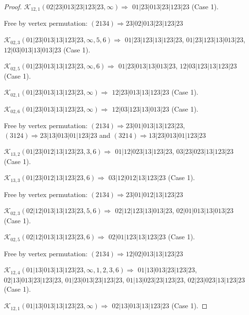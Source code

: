 \documentclass[12pt]{article}
\theoremstyle{plain}
\theoremstyle{definition}
\theoremstyle{remark}
\newcommand{\fancy}[1]{\mathcal{#1}}
\def\K{\fancy{K}}
\begin{document}
\begin{proof}
	$\K_{12,1}(02|23|013|23|123|23,\infty)\Rightarrow $ $01|23|013|23|123|23$ (Case 1).
	
	
	
	Free by vertex permutation: $(2 1 3 4)\Rightarrow 23|02|013|23|123|23$
	
	
	
	\bigskip
	
	$\K_{02,3}(01|23|013|13|123|23,\infty,5, 6)\Rightarrow $ $01|23|123|13|123|23$, $01|23|123|13|013|23$, $12|03|013|13|013|23$ (Case 1).
	
	$\K_{02,5}(01|23|013|13|123|23,\infty,6)\Rightarrow $ $01|23|013|13|013|23$, $12|03|123|13|123|23$ (Case 1).
	
	$\K_{02,1}(01|23|013|13|123|23,\infty)\Rightarrow $ $12|23|013|13|123|23$ (Case 1).
	
	$\K_{02,6}(01|23|013|13|123|23,\infty)\Rightarrow $ $12|03|123|13|013|23$ (Case 1).
	
	
	
	Free by vertex permutation: $(2 1 3 4)\Rightarrow 23|01|013|13|123|23$, $(3 1 2 4)\Rightarrow 23|13|013|01|123|23$ and $(3 2 1 4)\Rightarrow 13|23|013|01|123|23$
	
	
	
	\bigskip
	
	$\K_{13,2}(01|23|012|13|123|23,3, 6)\Rightarrow $ $01|12|023|13|123|23$, $03|23|023|13|123|23$ (Case 1).
	
	$\K_{13,3}(01|23|012|13|123|23,6)\Rightarrow $ $03|12|012|13|123|23$ (Case 1).
	
	
	
	Free by vertex permutation: $(2 1 3 4)\Rightarrow 23|01|012|13|123|23$
	
	
	
	\bigskip
	
	$\K_{02,3}(02|12|013|13|123|23,5, 6)\Rightarrow $ $02|12|123|13|013|23$, $02|01|013|13|013|23$ (Case 1).
	
	$\K_{02,5}(02|12|013|13|123|23,6)\Rightarrow $ $02|01|123|13|123|23$ (Case 1).
	
	
	
	Free by vertex permutation: $(2 1 3 4)\Rightarrow 12|02|013|13|123|23$
	
	
	
	\bigskip
	
	$\K_{12,4}(01|13|013|13|123|23,\infty,1, 2, 3, 6)\Rightarrow $ $01|13|013|23|123|23$, $02|13|013|23|123|23$, $01|23|013|23|123|23$, $01|13|023|23|123|23$, $02|23|023|13|123|23$ (Case 1).
	
	$\K_{12,1}(01|13|013|13|123|23,\infty)\Rightarrow $ $02|13|013|13|123|23$ (Case 1).
	

\end{proof}
\end{document}
